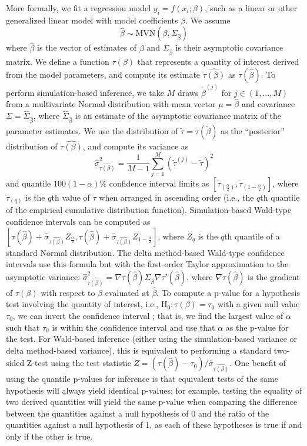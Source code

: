 More formally, we fit a regression model \(y_i = f(x_i; \beta)\), such as a linear or other generalized linear model with model coefficients \(\beta\). We assume \[
\hat{\beta} \sim \text{MVN}(\beta, \Sigma_{\hat{\beta}})
\] where \(\hat{\beta}\) is the vector of estimates of \(\beta\) and \(\Sigma_{\hat{\beta}}\) is their asymptotic covariance matrix. We define a function \(\tau(\beta)\) that represents a quantity of interest derived from the model parameters, and compute its estimate \(\widehat{\tau(\beta)}\) as \(\tau(\hat{\beta})\). To perform simulation-based inference, we take \(M\) draws \(\tilde{\beta}^{(j)}\) for \(j\in(1, \dots, M)\) from a multivariate Normal distribution with mean vector \(\mu = \hat{\beta}\) and covariance \(\Sigma = \hat{\Sigma}_{\hat{\beta}}\), where \(\hat{\Sigma}_{\hat{\beta}}\) is an estimate of the asymptotic covariance matrix of the parameter estimates. We use the distribution of \(\tilde{\tau}=\tau(\tilde{\beta})\) as the ``posterior'' distribution of \(\widehat{\tau(\beta)}\), and compute its variance as \[
\hat\sigma^2_{\widehat{\tau(\beta)}} = \frac{1}{M-1}\sum^M_{j=1}{(\tilde{\tau}^{(j)} - \bar{\tilde{\tau}})^2}
\] and quantile \(100(1-\alpha)\%\) confidence interval limits as \(\left[\tilde{\tau}_{(\frac{\alpha}{2})}, \tilde{\tau}_{(1-\frac{\alpha}{2})}\right]\), where \(\tilde{\tau}_{(q)}\) is the \(q\)th value of \(\tilde{\tau}\) when arranged in ascending order (i.e., the \(q\)th quantile of the empirical cumulative distribution function). Simulation-based Wald-type confidence intervals can be computed as \(\left[\tau(\hat{\beta}) + \hat\sigma_{\widehat{\tau(\beta)}} Z_{\frac{\alpha}{2}}, \tau(\hat{\beta}) + \hat\sigma_{\widehat{\tau(\beta)}} Z_{1-\frac{\alpha}{2}}\right]\), where \(Z_q\) is the \(q\)th quantile of a standard Normal distribution. The delta method-based Wald-type confidence intervals use this formula but with the first-order Taylor approximation to the asymptotic variance: \(\hat\sigma^2_{\widehat{\tau(\beta)}}=\nabla\tau(\hat{\beta}) \Sigma_{\hat{\beta}} \nabla\tau'(\hat{\beta})\), where \(\nabla\tau(\hat{\beta})\) is the gradient of \(\tau(\beta)\) with respect to \(\beta\) evaluated at \(\hat{\beta}\).
To compute a p-value for a hypothesis test involving the quantity of interest, i.e., \(\text{H}_0: \tau (\beta) = \tau_0\) with a given null value \(\tau_0\), we can invert the confidence interval \citep{thulinModernStatisticsWrangling2021}; that is, we find the largest value of \(\alpha\) such that \(\tau_0\) is within the confidence interval and use that \(\alpha\) as the p-value for the test. For Wald-based inference (either using the simulation-based variance or delta method-based variance), this is equivalent to performing a standard two-sided Z-test using the test statistic \(Z=\left(\tau(\hat\beta)-\tau_0\right) / \hat\sigma_{\widehat{\tau(\beta)}}\). One benefit of using the quantile p-values for inference is that equivalent tests of the same hypothesis will always yield identical p-values; for example, testing the equality of two derived quantities will yield the same p-value when comparing the difference between the quantities against a null hypothesis of 0 and the ratio of the quantities against a null hypothesis of 1, as each of these hypotheses is true if and only if the other is true.

